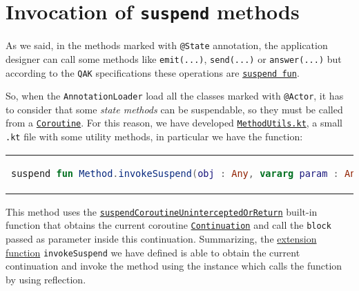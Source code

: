 \section{Invocation of \texttt{suspend} methods}

As we said, in the methods marked with \texttt{@State} annotation, the application designer can call some methods like \texttt{emit(...)}, \texttt{send(...)} or \texttt{answer(...)} but according to the \texttt{QAK} specifications these operations are \href{https://kotlinlang.org/docs/coroutines-basics.html#extract-function-refactoring}{\texttt{suspend fun}}.

So, when the \texttt{AnnotationLoader} load all the classes marked with \texttt{@Actor}, it has to consider that some \textit{state methods} can be suspendable, so they must be called from a \href{https://kotlinlang.org/docs/coroutines-guide.html}{\texttt{Coroutine}}.
For this reason, we have developed \href{https://github.com/LM-96/QA-Extensions/blob/main/it.unibo.qakactor/src/main/kotlin/utils/MethodUtils.kt}{\texttt{MethodUtils.kt}}, a small \texttt{.kt} file with some utility methods, in particular we have the function:
\begin{center}
	\begin{tabular}{c}
		\begin{lstlisting}[frame=none,numbers=none,language=Kotlin]
			suspend fun Method.invokeSuspend(obj : Any, vararg param : Any?) : Any
		\end{lstlisting}
	\end{tabular}
\end{center}

This method uses the \href{https://kotlinlang.org/api/latest/jvm/stdlib/kotlin.coroutines.intrinsics/suspend-coroutine-unintercepted-or-return.html}{\texttt{suspendCoroutineUninterceptedOrReturn}} built-in function that obtains the current coroutine \href{https://kotlinlang.org/api/latest/jvm/stdlib/kotlin.coroutines/-continuation/}{\texttt{Continuation}} and call the \texttt{block} passed as parameter inside this continuation.
Summarizing, the \href{https://kotlinlang.org/docs/extensions.html}{extension function} \texttt{invokeSuspend} we have defined is able to obtain the current continuation and invoke the method using the instance which calls the function by using reflection.


